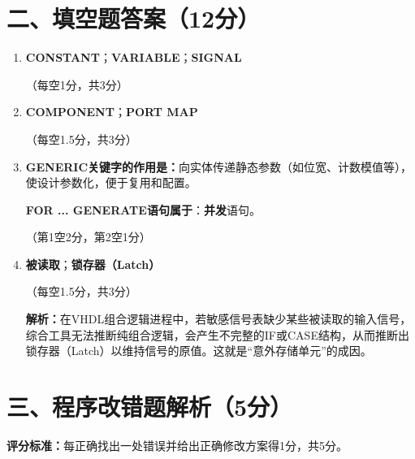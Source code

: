 \section{二、填空题答案（12分）}

\begin{enumerate}[label=\arabic*.]

\item \textbf{CONSTANT}；\textbf{VARIABLE}；\textbf{SIGNAL}

（每空1分，共3分）

\item \textbf{COMPONENT}；\textbf{PORT MAP}

（每空1.5分，共3分）

\item \textbf{GENERIC关键字的作用是：}向实体传递静态参数（如位宽、计数模值等），使设计参数化，便于复用和配置。

\textbf{FOR ... GENERATE语句属于}：\textbf{并发}语句。

（第1空2分，第2空1分）

\item \textbf{被读取}；\textbf{锁存器（Latch）}

（每空1.5分，共3分）

\textbf{解析：}在VHDL组合逻辑进程中，若敏感信号表缺少某些被读取的输入信号，综合工具无法推断纯组合逻辑，会产生不完整的IF或CASE结构，从而推断出锁存器（Latch）以维持信号的原值。这就是“意外存储单元”的成因。

\end{enumerate}

\section{三、程序改错题解析（5分）}

\begin{framed}
\textbf{评分标准：}每正确找出一处错误并给出正确修改方案得1分，共5分。
\end{framed}

